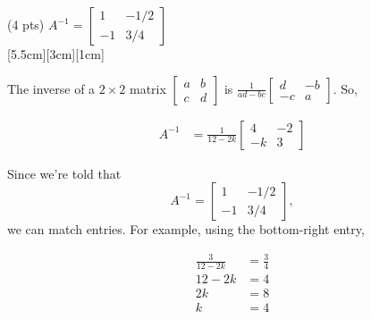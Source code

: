 \documentclass[11pt]{article}
\begin{document}
\begin{prob}[(12 pts)]
\begin{subprob}(4 pts) $A^{-1} = \begin{bmatrix} 1 & -1/2 \\ -1 & 3/4 \end{bmatrix}$ \\

[5.5cm][3cm][1cm]

\begin{solution}
The inverse of a $2 \times 2$ matrix $\begin{bmatrix} a & b \\ c & d \end{bmatrix}$ is $\frac{1}{ad - bc} \begin{bmatrix} d & -b \\ -c & a \end{bmatrix}$. So,

\begin{align*}
A^{-1} &= \frac{1}{12 - 2k} \begin{bmatrix} 4 & -2 \\ -k & 3 \end{bmatrix}
\end{align*}

Since we're told that
\[
A^{-1} = \begin{bmatrix} 1 & -1/2 \\ -1 & 3/4 \end{bmatrix},
\]
we can match entries. For example, using the bottom-right entry,

\begin{align*}
\frac{3}{12 - 2k} &= \frac{3}{4} \\
12 - 2k &= 4 \\
2k &= 8 \\
k &= 4
\end{align*}
\end{solution}
\end{subprob}

\end{prob}
\end{document}
